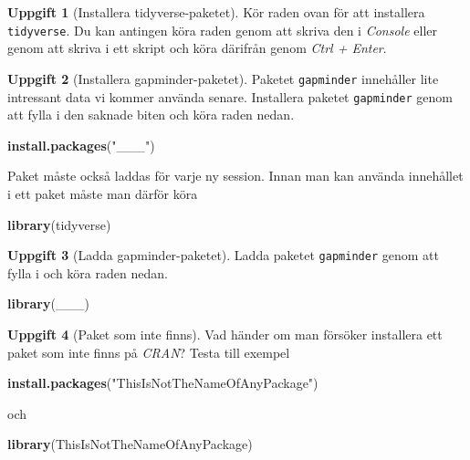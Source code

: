 \documentclass[
]{book}
\newenvironment{Shaded}{\begin{snugshade}}{\end{snugshade}}
\newcommand{\FunctionTok}[1]{\textcolor[rgb]{0.13,0.29,0.53}{\textbf{#1}}}
\newcommand{\NormalTok}[1]{#1}
\newcommand{\StringTok}[1]{\textcolor[rgb]{0.31,0.60,0.02}{#1}}
\theoremstyle{definition}
\theoremstyle{definition}
\theoremstyle{definition}
\newtheorem{exercise}{Uppgift}[chapter]
\theoremstyle{definition}
\theoremstyle{remark}
\begin{document}
\begin{exercise}[Installera tidyverse-paketet]
Kör raden ovan för att installera \texttt{tidyverse}. Du kan antingen köra raden genom att skriva den i \emph{Console} eller genom att skriva i ett skript och köra därifrån genom \emph{Ctrl + Enter}.
\end{exercise}

\begin{exercise}[Installera gapminder-paketet]

Paketet \texttt{gapminder} innehåller lite intressant data vi kommer använda senare. Installera paketet \texttt{gapminder} genom att fylla i den saknade biten och köra raden nedan.

\begin{Shaded}
\begin{Highlighting}[]
\FunctionTok{install.packages}\NormalTok{(}\StringTok{"\_\_\_"}\NormalTok{)}
\end{Highlighting}
\end{Shaded}

\end{exercise}

Paket måste också laddas för varje ny session. Innan man kan använda innehållet i ett paket måste man därför köra

\begin{Shaded}
\begin{Highlighting}[]
\FunctionTok{library}\NormalTok{(tidyverse)}
\end{Highlighting}
\end{Shaded}

\begin{exercise}[Ladda gapminder-paketet]

Ladda paketet \texttt{gapminder} genom att fylla i och köra raden nedan.

\begin{Shaded}
\begin{Highlighting}[]
\FunctionTok{library}\NormalTok{(\_\_\_)}
\end{Highlighting}
\end{Shaded}

\end{exercise}

\begin{exercise}[Paket som inte finns]

Vad händer om man försöker installera ett paket som inte finns på \emph{CRAN}? Testa till exempel

\begin{Shaded}
\begin{Highlighting}[]
\FunctionTok{install.packages}\NormalTok{(}\StringTok{"ThisIsNotTheNameOfAnyPackage"}\NormalTok{)}
\end{Highlighting}
\end{Shaded}

och

\begin{Shaded}
\begin{Highlighting}[]
\FunctionTok{library}\NormalTok{(ThisIsNotTheNameOfAnyPackage)}
\end{Highlighting}
\end{Shaded}

\end{exercise}
\end{document}
